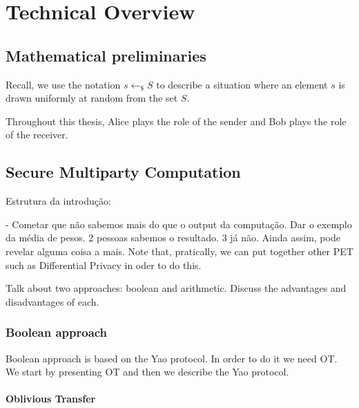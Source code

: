 


%

\chapter{Technical Overview}

\section{Mathematical preliminaries}

Recall, we use the notation $s\leftarrow_{\$}S$ to describe a situation where an element $s$ is drawn uniformly at random from the set $S$.

Throughout this thesis, Alice plays the role of the sender and Bob plays the role of the receiver.

\section{Secure Multiparty Computation}


Estrutura da introdução:

- Cometar que não sabemos mais do que o output da computação. Dar o exemplo da média de pesos. 2 pessoas sabemos o resultado. 3 já não. Ainda assim, pode revelar alguma coisa a mais. Note that, pratically, we can put together other PET such as Differential Privacy in oder to do this.




Talk about two approaches: boolean and arithmetic. Discuss the advantages and disadvantages of each.

\subsection{Boolean approach}

Boolean approach is based on the Yao protocol. In order to do it we need OT. We start by presenting OT and then we describe the Yao protocol.


\subsubsection{Oblivious Transfer}

